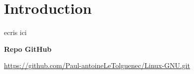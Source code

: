 \section{Introduction}
\paragraph{}
ecris ici

\textbf{Repo GitHub}

\url{https://github.com/Paul-antoineLeTolguenec/Linux-GNU.git}

\newpage
